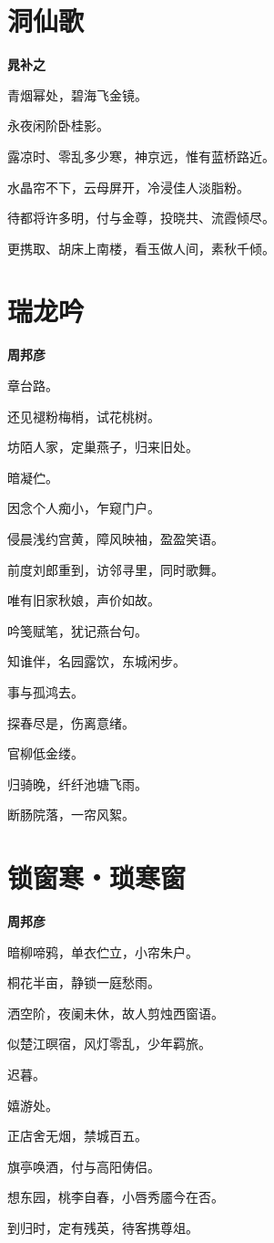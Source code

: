 \documentclass[12pt,a4paper]{ctexbook}
\begin{document}
\section{洞仙歌}
\textbf{晁补之}\par\vspace{0.5em}
青烟幂处，碧海飞金镜。\par
永夜闲阶卧桂影。\par
露凉时、零乱多少寒，神京远，惟有蓝桥路近。\par
水晶帘不下，云母屏开，冷浸佳人淡脂粉。\par
待都将许多明，付与金尊，投晓共、流霞倾尽。\par
更携取、胡床上南楼，看玉做人间，素秋千倾。\par

\section{瑞龙吟}
\textbf{周邦彦}\par\vspace{0.5em}
章台路。\par
还见褪粉梅梢，试花桃树。\par
坊陌人家，定巢燕子，归来旧处。\par
暗凝伫。\par
因念个人痴小，乍窥门户。\par
侵晨浅约宫黄，障风映袖，盈盈笑语。\par
前度刘郎重到，访邻寻里，同时歌舞。\par
唯有旧家秋娘，声价如故。\par
吟笺赋笔，犹记燕台句。\par
知谁伴，名园露饮，东城闲步。\par
事与孤鸿去。\par
探春尽是，伤离意绪。\par
官柳低金缕。\par
归骑晚，纤纤池塘飞雨。\par
断肠院落，一帘风絮。\par

\section{锁窗寒・琐寒窗}
\textbf{周邦彦}\par\vspace{0.5em}
暗柳啼鸦，单衣伫立，小帘朱户。\par
桐花半亩，静锁一庭愁雨。\par
洒空阶，夜阑未休，故人剪烛西窗语。\par
似楚江暝宿，风灯零乱，少年羁旅。\par
迟暮。\par
嬉游处。\par
正店舍无烟，禁城百五。\par
旗亭唤酒，付与高阳俦侣。\par
想东园，桃李自春，小唇秀靥今在否。\par
到归时，定有残英，待客携尊俎。\par
\end{document}
